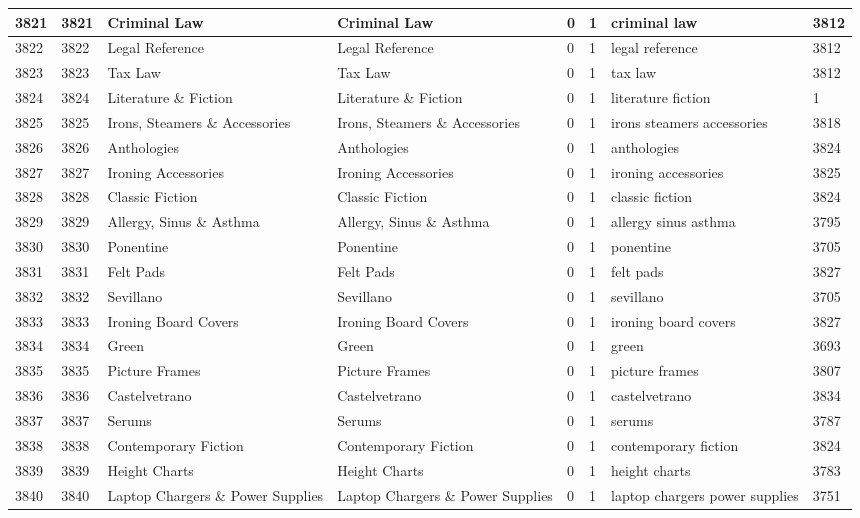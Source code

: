 \begin{longtable}{|l|l|l|l|l|l|l|l|}
3821 & 3821 & Criminal Law & Criminal Law & 0 & 1 & criminal law & 3812 \\ \hline 
3822 & 3822 & Legal Reference & Legal Reference & 0 & 1 & legal reference & 3812 \\ \hline 
3823 & 3823 & Tax Law & Tax Law & 0 & 1 & tax law & 3812 \\ \hline 
3824 & 3824 & Literature \& Fiction & Literature \& Fiction & 0 & 1 & literature fiction & 1 \\ \hline 
3825 & 3825 & Irons, Steamers \& Accessories & Irons, Steamers \& Accessories & 0 & 1 & irons steamers accessories & 3818 \\ \hline 
3826 & 3826 & Anthologies & Anthologies & 0 & 1 & anthologies & 3824 \\ \hline 
3827 & 3827 & Ironing Accessories & Ironing Accessories & 0 & 1 & ironing accessories & 3825 \\ \hline 
3828 & 3828 & Classic Fiction & Classic Fiction & 0 & 1 & classic fiction & 3824 \\ \hline 
3829 & 3829 & Allergy, Sinus \& Asthma & Allergy, Sinus \& Asthma & 0 & 1 & allergy sinus asthma & 3795 \\ \hline 
3830 & 3830 & Ponentine & Ponentine & 0 & 1 & ponentine & 3705 \\ \hline 
3831 & 3831 & Felt Pads & Felt Pads & 0 & 1 & felt pads & 3827 \\ \hline 
3832 & 3832 & Sevillano & Sevillano & 0 & 1 & sevillano & 3705 \\ \hline 
3833 & 3833 & Ironing Board Covers & Ironing Board Covers & 0 & 1 & ironing board covers & 3827 \\ \hline 
3834 & 3834 & Green & Green & 0 & 1 & green & 3693 \\ \hline 
3835 & 3835 & Picture Frames & Picture Frames & 0 & 1 & picture frames & 3807 \\ \hline 
3836 & 3836 & Castelvetrano & Castelvetrano & 0 & 1 & castelvetrano & 3834 \\ \hline 
3837 & 3837 & Serums & Serums & 0 & 1 & serums & 3787 \\ \hline 
3838 & 3838 & Contemporary Fiction & Contemporary Fiction & 0 & 1 & contemporary fiction & 3824 \\ \hline 
3839 & 3839 & Height Charts & Height Charts & 0 & 1 & height charts & 3783 \\ \hline 
3840 & 3840 & Laptop Chargers \& Power Supplies & Laptop Chargers \& Power Supplies & 0 & 1 & laptop chargers power supplies & 3751 \\ \hline 

\end{longtable}
